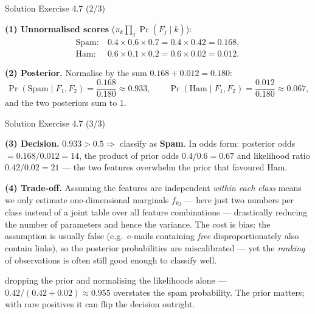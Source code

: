 \documentclass[aspectratio=169,11pt]{beamer}
\begin{document}
\begin{frame}{Solution \textemdash{} Exercise 4.7 (2/3)}
\begin{solutionbox}
\textbf{(1) Unnormalised scores} ($\pi_k\prod_j \Pr(F_j\mid k)$):
\[
\begin{aligned}
  \text{Spam}:&\ 0.4\times 0.6\times 0.7 = 0.4\times 0.42 = 0.168,\\
  \text{Ham}:&\ 0.6\times 0.1\times 0.2 = 0.6\times 0.02 = 0.012.
\end{aligned}
\]

\textbf{(2) Posterior.} Normalise by the sum $0.168+0.012=0.180$:
\[
  \Pr(\text{Spam}\mid F_1,F_2) = \frac{0.168}{0.180} \approx 0.933,
  \qquad
  \Pr(\text{Ham}\mid F_1,F_2) = \frac{0.012}{0.180} \approx 0.067 ,
\]
and the two posteriors sum to $1$. \checkmark
\end{solutionbox}
\end{frame}

\begin{frame}{Solution \textemdash{} Exercise 4.7 (3/3)}
\begin{solutionbox}
\textbf{(3) Decision.} $0.933>0.5 \Rightarrow$ classify as
\textbf{Spam}. In odds form: posterior odds
$=0.168/0.012 = 14$, the product of prior odds
$0.4/0.6=0.67$ and likelihood ratio $0.42/0.02=21$ --- the two features
overwhelm the prior that favoured Ham.

\vspace{1mm}
\textbf{(4) Trade-off.}
Assuming the features are independent \emph{within each class} means we
only estimate one-dimensional marginals $f_{kj}$ --- here just two
numbers per class instead of a joint table over all feature
combinations --- drastically reducing
the number of parameters and hence the variance. The cost is bias: the
assumption is usually false (e.g.\ e-mails containing \emph{free}
disproportionately also contain links), so the posterior
probabilities are miscalibrated --- yet the \emph{ranking} of
observations is often still good enough to classify well.
\end{solutionbox}
\begin{mistake}
dropping the prior and normalising the
likelihoods alone --- $0.42/(0.42+0.02)\approx 0.955$ overstates the
spam probability. The prior matters; with rare positives it can flip
the decision outright.
\end{mistake}
\end{frame}
\end{document}
